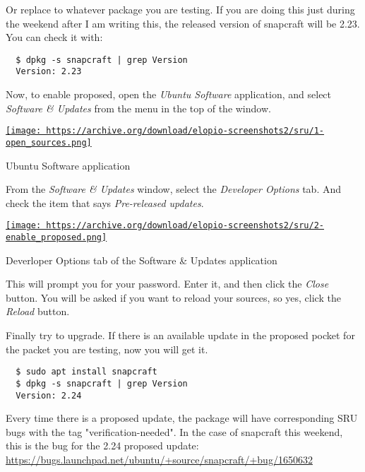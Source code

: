 \documentclass[12pt]{article}
\begin{document}
Or replace  to whatever package you are testing. If you are
doing this just during the weekend after I am writing this, the released
version of snapcraft will be 2.23. You can check it with:

\begin{verbatim}
  $ dpkg -s snapcraft | grep Version
  Version: 2.23
\end{verbatim}

Now, to enable proposed, open the \emph{Ubuntu Software} application, and
select \emph{Software & Updates} from the menu in the top of the window.

\begin{center}
  \href{
    https://archive.org/download/elopio-screenshots2/sru/1-open_sources.png}{
    \texttt{[image: 
    https://archive.org/download/elopio-screenshots2/sru/1-open\_sources.png]}
  }
  \caption{Ubuntu Software application}
\end{center}

From the \emph{Software & Updates} window, select the \emph{Developer Options}
tab. And check the item that says \emph{Pre-released updates}.

\begin{center}
  \href{
    https://archive.org/download/elopio-screenshots2/sru/2-enable_proposed.png}{
    \texttt{[image: 
    https://archive.org/download/elopio-screenshots2/sru/2-enable\_proposed.png]}
  }
  \caption{Deverloper Options tab of the Software & Updates application}
\end{center}

This will prompt you for your password. Enter it, and then click the
\emph{Close} button. You will be asked if you want to reload your sources, so
yes, click the \emph{Reload} button.

Finally try to upgrade. If there is an available update in the proposed pocket
for the packet you are testing, now you will get it.

\begin{verbatim}
  $ sudo apt install snapcraft
  $ dpkg -s snapcraft | grep Version
  Version: 2.24
\end{verbatim}

Every time there is a proposed update, the package will have corresponding SRU
bugs with the tag "verification-needed". In the case of snapcraft this weekend,
this is the bug for the 2.24 proposed update:
\href{https://bugs.launchpad.net/ubuntu/+source/snapcraft/+bug/1650632}
     {https://bugs.launchpad.net/ubuntu/+source/snapcraft/+bug/1650632}
\end{document}
